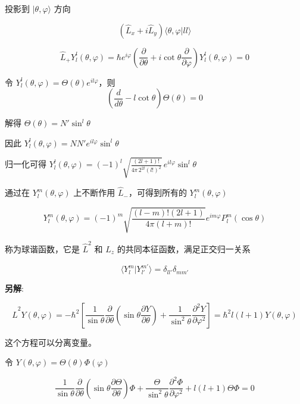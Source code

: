 \documentclass[lang=cn,10pt]{elegantbook}
\begin{document}
投影到 $|\theta, \varphi\rangle$ 方向

\begin{equation}
	(\hat{L}_x + i\hat{L}_y) \langle \theta, \varphi | l l \rangle
\end{equation}

\begin{equation}
	\hat{L}_+Y_l^l(\theta,\varphi)=\hbar e^{i\varphi}\left(\frac{\partial}{\partial\theta}+i\cot\theta\frac{\partial}{\partial\varphi}\right)Y_l^l(\theta,\varphi)=0
\end{equation}

令 \(Y_l^l(\theta,\varphi)=\Theta(\theta)e^{il\varphi}\)，则
\begin{equation}
	\left(\frac{d}{d\theta}-l\cot\theta\right)\Theta(\theta)=0
\end{equation}

解得 \(\Theta(\theta)=N'\sin^l\theta\)

因此 \(Y_l^l(\theta,\varphi)=N N' e^{il\varphi}\sin^l\theta\)

归一化可得 \(Y_l^l(\theta,\varphi)=(-1)^l\sqrt{\frac{(2l+1)!}{4\pi\,2^{2l}(l!)^2}}\,e^{il\varphi}\sin^l\theta\)

通过在 $Y_{l}^{m}(\theta, \varphi)$ 上不断作用 $\hat{L}_-$，可得到所有的 $Y_{l}^{m}(\theta, \varphi)$

\begin{equation}
	Y_{l}^{m}(\theta, \varphi) = (-1)^m\sqrt{\frac{(l-m)!(2l+1)}{4\pi (l+m)!}} e^{im\varphi} P_{l}^{m}(\cos \theta)
\end{equation}

称为球谐函数，它是 $\hat{L}^2$ 和 $\hat{L}_z$ 的共同本征函数，满足正交归一关系

\begin{equation}
	\langle Y_{l}^{m} | Y_{l'}^{m'} \rangle = \delta_{ll'} \delta_{mm'}
\end{equation}


\textbf{另解}:

\[
\hat{L}^2 Y(\theta, \varphi) = -\hbar^2 \left[ \frac{1}{\sin\theta} \frac{\partial}{\partial \theta} \left( \sin\theta \frac{\partial Y}{\partial \theta} \right) + \frac{1}{\sin^2\theta} \frac{\partial^2 Y}{\partial \varphi^2} \right] = \hbar^2 l(l+1) Y(\theta, \varphi)
\]

这个方程可以分离变量。

令 $Y(\theta, \varphi) = \Theta(\theta) \Phi(\varphi)$

\[
\frac{1}{\sin\theta} \frac{\partial}{\partial \theta} \left( \sin\theta \frac{\partial \Theta}{\partial \theta} \right) \Phi + \frac{\Theta}{\sin^2\theta} \frac{\partial^2 \Phi}{\partial \varphi^2} + l(l+1) \Theta \Phi = 0
\]
\end{document}
